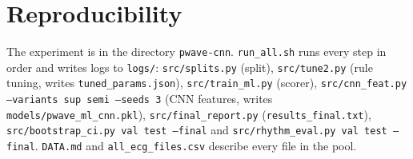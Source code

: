 \documentclass[11pt,a4paper]{article}
\newcommand{\code}[1]{\texttt{#1}}
\begin{document}
\section*{Reproducibility}

\begin{sloppypar}
The experiment is in the directory \code{pwave-cnn}. \code{run\_all.sh} runs every step in order and writes logs to \code{logs/}: \code{src/splits.py} (split), \code{src/tune2.py} (rule tuning, writes \code{tuned\_params.json}), \code{src/train\_ml.py} (scorer), \code{src/cnn\_feat.py --variants sup semi --seeds 3} (CNN features, writes \code{models/pwave\_ml\_cnn.pkl}), \code{src/final\_report.py} (\code{results\_final.txt}), \code{src/bootstrap\_ci.py val test --final} and \code{src/rhythm\_eval.py val test --final}. \code{DATA.md} and \code{all\_ecg\_files.csv} describe every file in the pool.
\end{sloppypar}
\end{document}
